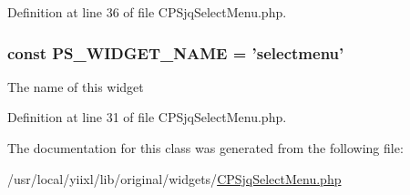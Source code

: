 Definition at line 36 of file CPSjqSelectMenu.php.

\hypertarget{classCPSjqSelectMenu_ae357f9dc377f7de0d12010b2ced28cbc}{
\subsubsection[{PS\_\-WIDGET\_\-NAME}]{\setlength{\rightskip}{0pt plus 5cm}const {\bf PS\_\-WIDGET\_\-NAME} = 'selectmenu'}}
\label{classCPSjqSelectMenu_ae357f9dc377f7de0d12010b2ced28cbc}
The name of this widget 

Definition at line 31 of file CPSjqSelectMenu.php.



The documentation for this class was generated from the following file:\begin{DoxyCompactItemize}
\item 
/usr/local/yiixl/lib/original/widgets/\hyperlink{CPSjqSelectMenu_8php}{CPSjqSelectMenu.php}\end{DoxyCompactItemize}
